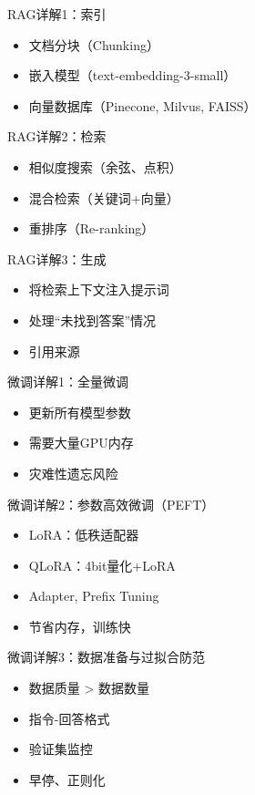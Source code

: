 \begin{frame}{RAG详解1：索引}
\begin{itemize}
    \item 文档分块（Chunking）
    \item 嵌入模型（text-embedding-3-small）
    \item 向量数据库（Pinecone, Milvus, FAISS）
\end{itemize}
\end{frame}
\begin{frame}{RAG详解2：检索}
\begin{itemize}
    \item 相似度搜索（余弦、点积）
    \item 混合检索（关键词+向量）
    \item 重排序（Re-ranking）
\end{itemize}
\end{frame}
\begin{frame}{RAG详解3：生成}
\begin{itemize}
    \item 将检索上下文注入提示词
    \item 处理“未找到答案”情况
    \item 引用来源
\end{itemize}
\end{frame}

\begin{frame}{微调详解1：全量微调}
\begin{itemize}
    \item 更新所有模型参数
    \item 需要大量GPU内存
    \item 灾难性遗忘风险
\end{itemize}
\end{frame}
\begin{frame}{微调详解2：参数高效微调（PEFT）}
\begin{itemize}
    \item LoRA：低秩适配器
    \item QLoRA：4bit量化+LoRA
    \item Adapter, Prefix Tuning
    \item 节省内存，训练快
\end{itemize}
\end{frame}
\begin{frame}{微调详解3：数据准备与过拟合防范}
\begin{itemize}
    \item 数据质量 > 数据数量
    \item 指令-回答格式
    \item 验证集监控
    \item 早停、正则化
\end{itemize}
\end{frame}

